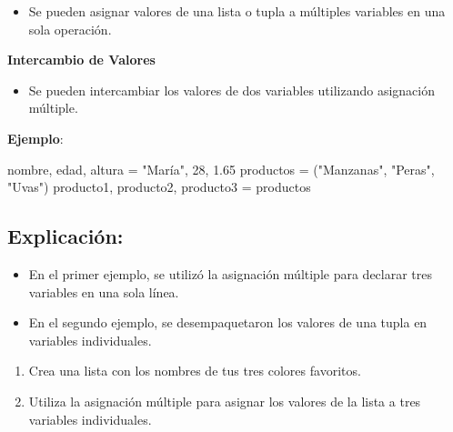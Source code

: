 \documentclass[
  a4paper,
  DIV=11,
  numbers=noendperiod,
  onepage,
  openany]{scrreprt}
\newenvironment{Shaded}{\begin{snugshade}}{\end{snugshade}}
\newcommand{\DecValTok}[1]{\textcolor[rgb]{0.68,0.00,0.00}{#1}}
\newcommand{\FloatTok}[1]{\textcolor[rgb]{0.68,0.00,0.00}{#1}}
\newcommand{\NormalTok}[1]{\textcolor[rgb]{0.00,0.23,0.31}{#1}}
\newcommand{\OperatorTok}[1]{\textcolor[rgb]{0.37,0.37,0.37}{#1}}
\newcommand{\StringTok}[1]{\textcolor[rgb]{0.13,0.47,0.30}{#1}}
\providecommand{\tightlist}{%
  \setlength{\itemsep}{0pt}\setlength{\parskip}{0pt}}\usepackage{longtable,booktabs,array}
\begin{document}
\begin{itemize}
\tightlist
\item
  Se pueden asignar valores de una lista o tupla a múltiples variables
  en una sola operación.
\end{itemize}

\textbf{Intercambio de Valores}

\begin{itemize}
\tightlist
\item
  Se pueden intercambiar los valores de dos variables utilizando
  asignación múltiple.
\end{itemize}

\textbf{Ejemplo}:

\begin{Shaded}
\begin{Highlighting}[]
\NormalTok{nombre, edad, altura }\OperatorTok{=} \StringTok{"María"}\NormalTok{, }\DecValTok{28}\NormalTok{, }\FloatTok{1.65}
\NormalTok{productos }\OperatorTok{=}\NormalTok{ (}\StringTok{"Manzanas"}\NormalTok{, }\StringTok{"Peras"}\NormalTok{, }\StringTok{"Uvas"}\NormalTok{)}
\NormalTok{producto1, producto2, producto3 }\OperatorTok{=}\NormalTok{ productos}
\end{Highlighting}
\end{Shaded}

\subsection{Explicación:}\label{explicaciuxf3n-3}

\begin{itemize}
\item
  En el primer ejemplo, se utilizó la asignación múltiple para declarar
  tres variables en una sola línea.
\item
  En el segundo ejemplo, se desempaquetaron los valores de una tupla en
  variables individuales.
\end{itemize}

\begin{tcolorbox}[enhanced jigsaw, toptitle=1mm, toprule=.15mm, title=\textcolor{quarto-callout-tip-color}{\faLightbulb}\hspace{0.5em}{Actividad Práctica}, colbacktitle=quarto-callout-tip-color!10!white, opacitybacktitle=0.6, titlerule=0mm, colback=white, left=2mm, bottomrule=.15mm, breakable, bottomtitle=1mm, rightrule=.15mm, colframe=quarto-callout-tip-color-frame, arc=.35mm, leftrule=.75mm, coltitle=black, opacityback=0]

\begin{enumerate}
\def\labelenumi{\arabic{enumi}.}
\item
  Crea una lista con los nombres de tus tres colores favoritos.
\item
  Utiliza la asignación múltiple para asignar los valores de la lista a
  tres variables individuales.
\end{enumerate}

\end{tcolorbox}
\end{document}
